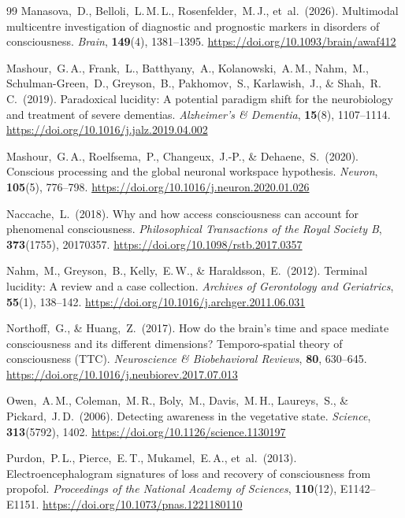 ﻿\documentclass[11pt,a4paper]{article}
\theoremstyle{plain}
\theoremstyle{definition}
\theoremstyle{remark}
\begin{document}
\begin{thebibliography}{99}
Manasova,~D., Belloli,~L.\,M.\,L., Rosenfelder,~M.\,J., et~al.\ (2026).
Multimodal multicentre investigation of diagnostic and prognostic markers in disorders of consciousness.
\textit{Brain}, \textbf{149}(4), 1381--1395.
\url{https://doi.org/10.1093/brain/awaf412}

Mashour,~G.\,A., Frank,~L., Batthyany,~A., Kolanowski,~A.\,M., Nahm,~M., Schulman-Green,~D., Greyson,~B., Pakhomov,~S., Karlawish,~J., \& Shah,~R.\,C.\ (2019).
Paradoxical lucidity: A potential paradigm shift for the neurobiology and treatment of severe dementias.
\textit{Alzheimer's \& Dementia}, \textbf{15}(8), 1107--1114.
\url{https://doi.org/10.1016/j.jalz.2019.04.002}

Mashour,~G.\,A., Roelfsema,~P., Changeux,~J.-P., \& Dehaene,~S.\ (2020).
Conscious processing and the global neuronal workspace hypothesis.
\textit{Neuron}, \textbf{105}(5), 776--798.
\url{https://doi.org/10.1016/j.neuron.2020.01.026}

Naccache,~L.\ (2018).
Why and how access consciousness can account for phenomenal consciousness.
\textit{Philosophical Transactions of the Royal Society B}, \textbf{373}(1755), 20170357.
\url{https://doi.org/10.1098/rstb.2017.0357}

Nahm,~M., Greyson,~B., Kelly,~E.\,W., \& Haraldsson,~E.\ (2012).
Terminal lucidity: A review and a case collection.
\textit{Archives of Gerontology and Geriatrics}, \textbf{55}(1), 138--142.
\url{https://doi.org/10.1016/j.archger.2011.06.031}

Northoff,~G., \& Huang,~Z.\ (2017).
How do the brain's time and space mediate consciousness and its different dimensions? Temporo-spatial theory of consciousness (TTC).
\textit{Neuroscience \& Biobehavioral Reviews}, \textbf{80}, 630--645.
\url{https://doi.org/10.1016/j.neubiorev.2017.07.013}

Owen,~A.\,M., Coleman,~M.\,R., Boly,~M., Davis,~M.\,H., Laureys,~S., \& Pickard,~J.\,D.\ (2006).
Detecting awareness in the vegetative state.
\textit{Science}, \textbf{313}(5792), 1402.
\url{https://doi.org/10.1126/science.1130197}

Purdon,~P.\,L., Pierce,~E.\,T., Mukamel,~E.\,A., et~al.\ (2013).
Electroencephalogram signatures of loss and recovery of consciousness from propofol.
\textit{Proceedings of the National Academy of Sciences}, \textbf{110}(12), E1142--E1151.
\url{https://doi.org/10.1073/pnas.1221180110}


\end{thebibliography}
\end{document}
